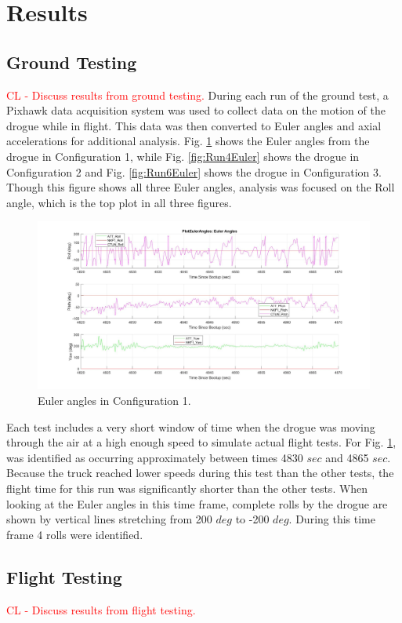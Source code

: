 \section{Results}
\label{sec:Results}

\subsection{Ground Testing}
\textcolor{red}{CL  - Discuss results from ground testing.}
During each run of the ground test, a Pixhawk data acquisition system was used to collect data on the motion of the drogue while in flight. This data was then converted to Euler angles and axial accelerations for additional analysis. Fig. \ref{fig:Run2Euler} shows the Euler angles from the drogue in Configuration 1, while Fig. \ref{fig:Run4Euler} shows the drogue in Configuration 2 and Fig. \ref{fig:Run6Euler} shows the drogue in Configuration 3. Though this figure shows all three Euler angles, analysis was focused on the Roll angle, which is the top plot in all three figures.

\begin{figure}
	\centering
	\includegraphics[width=1\linewidth]{./images/Run2_Euler}
	\caption{Euler angles in Configuration 1.} %
	\label{fig:Run2Euler}
\end{figure}

Each test includes a very short window of time when the drogue was moving through the air at a high enough speed to simulate actual flight tests. For Fig. \ref{fig:Run2Euler}, was identified as occurring approximately between times 4830 $sec$ and 4865 $sec$. Because the truck reached lower speeds during this test than the other tests, the flight time for this run was significantly shorter than the other tests. When looking at the Euler angles in this time frame, complete rolls by the drogue are shown by vertical lines stretching from 200 $deg$ to -200 $deg$. During this time frame 4 rolls were identified. 


\subsection{Flight Testing}
\textcolor{red}{CL  - Discuss results from flight testing.}


